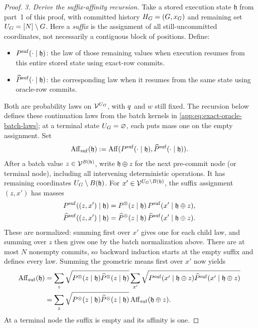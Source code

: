 \begin{proof}
\emph{3. Derive the suffix-affinity recursion.}
Take a stored execution state $\mathfrak h$ from part~1 of this proof, with committed
history $\History=(G,x_G)$ and remaining set
$\ResidualPositions=\PositionSet\setminus G$.
Here a \emph{suffix} is the assignment of all still-uncommitted coordinates,
not necessarily a contiguous block of positions.  Define:
\begin{itemize}
\item $\ExactSuffixLaw{\mathfrak h}$: the law of those remaining values
when execution resumes from this entire stored state using exact-row commits.
\item $\OracleSuffixLaw{\mathfrak h}$: the corresponding law when it
resumes from the same state using oracle-row commits.
\end{itemize}
Both are probability laws on $\Vocab^{\ResidualPositions}$, with
$\FrozenOracle$ and $w$ still fixed.  The recursion below defines these
continuation laws from the batch kernels in
\eqref{app:eq:exact-oracle-batch-laws}; at a terminal state
$\ResidualPositions=\varnothing$, each puts mass one on the empty assignment.
Set
\begin{equation}
 \SuffixAffinity{\mathfrak h}
 :=\HellingerAffinity(\ExactSuffixLaw{\mathfrak h},
                      \OracleSuffixLaw{\mathfrak h}).
 \label{app:eq:suffix-affinity}
\end{equation}
After a batch value $z\in\Vocab^{B(\mathfrak h)}$, write
$\mathfrak h\oplus z$ for the next pre-commit node (or terminal node),
including all intervening deterministic operations.  It has remaining
coordinates $\ResidualPositions\setminus B(\mathfrak h)$.
For $x'\in\Vocab^{\ResidualPositions\setminus B(\mathfrak h)}$,
the suffix assignment $(z,x')$ has masses
\begin{align*}
 \ExactSuffixMass{\mathfrak h}{(z,x')}
 &=\ExactBatchMass{\mathfrak h}{z}\,
   \ExactSuffixMass{\mathfrak h\oplus z}{x'},\\
 \OracleSuffixMass{\mathfrak h}{(z,x')}
 &=\OracleBatchMass{\mathfrak h}{z}\,
   \OracleSuffixMass{\mathfrak h\oplus z}{x'}.
\end{align*}
These are normalized: summing first over $x'$ gives one for each child
law, and summing over $z$ then gives one by the batch normalization above.
There are at most $N$ nonempty commits, so backward induction starts at
the empty suffix and defines every law.
Summing the geometric means first over $x'$ now yields
\begin{align}
 \SuffixAffinity{\mathfrak h}
 &=\sum_z\sqrt{\ExactBatchMass{\mathfrak h}{z}
               \OracleBatchMass{\mathfrak h}{z}}
       \sum_{x'}\sqrt{
        \ExactSuffixMass{\mathfrak h\oplus z}{x'}
        \OracleSuffixMass{\mathfrak h\oplus z}{x'}}\notag\\
 &=\sum_z\sqrt{\ExactBatchMass{\mathfrak h}{z}
               \OracleBatchMass{\mathfrak h}{z}}
       \SuffixAffinity{\mathfrak h\oplus z}.
 \label{app:eq:suffix-affinity-recursion}
\end{align}
At a terminal node the suffix is empty and its affinity is one.



\end{proof}
